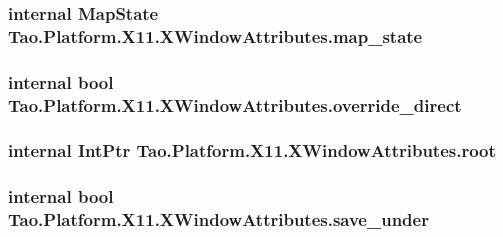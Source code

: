\label{struct_tao_1_1_platform_1_1_x11_1_1_x_window_attributes_a37d4be26b8f7ae394bf354452ce19007}
\hypertarget{struct_tao_1_1_platform_1_1_x11_1_1_x_window_attributes_a5a9988afcdd4fe82707b49ab23ea38b0}{
\subsubsection[{map\_\-state}]{\setlength{\rightskip}{0pt plus 5cm}internal {\bf MapState} {\bf Tao.Platform.X11.XWindowAttributes.map\_\-state}}}
\label{struct_tao_1_1_platform_1_1_x11_1_1_x_window_attributes_a5a9988afcdd4fe82707b49ab23ea38b0}
\hypertarget{struct_tao_1_1_platform_1_1_x11_1_1_x_window_attributes_ad12e60ca9391ed2044ad4bd7982362ab}{
\subsubsection[{override\_\-direct}]{\setlength{\rightskip}{0pt plus 5cm}internal bool {\bf Tao.Platform.X11.XWindowAttributes.override\_\-direct}}}
\label{struct_tao_1_1_platform_1_1_x11_1_1_x_window_attributes_ad12e60ca9391ed2044ad4bd7982362ab}
\hypertarget{struct_tao_1_1_platform_1_1_x11_1_1_x_window_attributes_a38df6590ae9ca8271cf0fffc2c80fc5e}{
\subsubsection[{root}]{\setlength{\rightskip}{0pt plus 5cm}internal IntPtr {\bf Tao.Platform.X11.XWindowAttributes.root}}}
\label{struct_tao_1_1_platform_1_1_x11_1_1_x_window_attributes_a38df6590ae9ca8271cf0fffc2c80fc5e}
\hypertarget{struct_tao_1_1_platform_1_1_x11_1_1_x_window_attributes_a0392f5cd7f0172d7b2a1f0e9063e4836}{
\subsubsection[{save\_\-under}]{\setlength{\rightskip}{0pt plus 5cm}internal bool {\bf Tao.Platform.X11.XWindowAttributes.save\_\-under}}}
